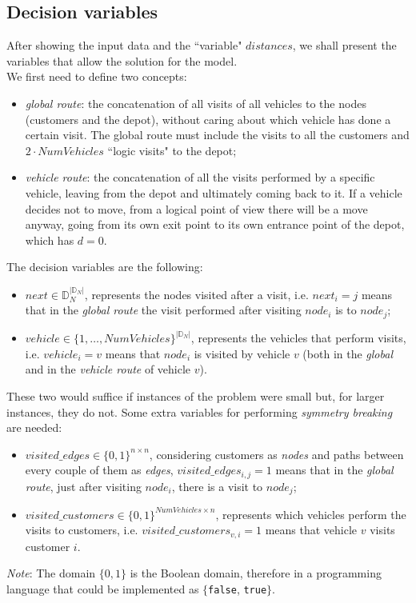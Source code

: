 \documentclass[../main.tex]{subfiles}
\begin{document}
\subsection{Decision variables}
\label{subsec:decision-variables}
After showing the input data and the ``variable" $distances$, we shall present the variables that allow the solution for the model.\\
We first need to define two concepts:
\begin{itemize}
    \item \textit{global route}: the concatenation of all visits of all vehicles to the nodes (customers and the depot), without caring about which vehicle has done a certain visit. The global route must include the visits to all the customers and $2 \cdot NumVehicles$ ``logic visits" to the depot;
    \item \textit{vehicle route}: the concatenation of all the visits performed by a specific vehicle, leaving from the depot and ultimately coming back to it. If a vehicle decides not to move, from a logical point of view there will be a move anyway, going from its own exit point to its own entrance point of the depot, which has $d = 0$.
\end{itemize}
The decision variables are the following:
\begin{itemize}
    \item $next \in \mathbb{D}_N^{|\mathbb{D}_N|}$, represents the nodes visited after a visit, i.e. $next_i = j$ means that in the \textit{global route} the visit performed after visiting $node_i$ is to $node_j$;
    \item $vehicle \in \{1,\dots,NumVehicles\}^{|\mathbb{D}_N|}$, represents the vehicles that perform visits, i.e. $vehicle_i = v$ means that $node_i$ is visited by vehicle $v$ (both in the \textit{global} and in the \textit{vehicle route} of vehicle $v$).
\end{itemize}
These two would suffice if instances of the problem were small but, for larger instances, they do not. Some extra variables for performing \textit{symmetry breaking} are needed:
\begin{itemize}
    \item $visited\_edges \in \{0,1\}^{n\times{}n}$, considering customers as \textit{nodes} and paths between every couple of them as \textit{edges}, $visited\_edges_{i,j} = 1$ means that in the \textit{global route}, just after visiting $node_i$, there is a visit to $node_j$;
    \item $visited\_customers \in \{0,1\}^{NumVehicles\times{}n}$, represents which vehicles perform the visits to customers, i.e. $visited\_customers_{v,i} = 1$ means that vehicle $v$ visits customer $i$.
\end{itemize}
\textit{Note}: The domain $\{0,1\}$ is the Boolean domain, therefore in a programming language that could be implemented as $\{$\texttt{false}, \texttt{true}$\}$.
\end{document}
